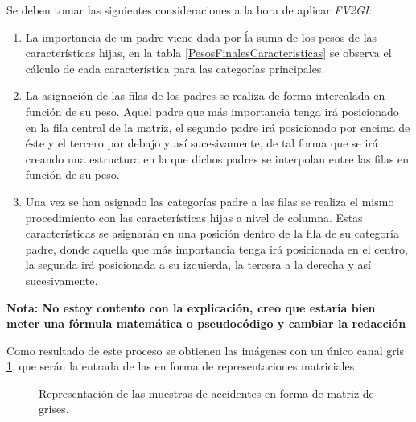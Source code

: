         Se deben tomar las siguientes consideraciones a la hora de aplicar \textit{FV2GI}:

        \begin{enumerate}

            \item La importancia de un padre viene dada por ĺa suma de los pesos de las características hijas, en la tabla \ref{PesosFinalesCaracteristicas} se observa el cálculo de cada característica para las categorías principales.

            \item La asignación de las filas de los padres se realiza de forma intercalada en función de su peso. Aquel padre que más importancia tenga irá posicionado en la fila central de la matriz, el segundo padre irá posicionado por encima de éste y el tercero por debajo y así sucesivamente, de tal forma que se irá creando una estructura en la que dichos padres se interpolan entre las filas en función de su peso.

            \item Una vez se han asignado las categorías padre a las filas se realiza el mismo procedimiento con las características hijas a nivel de columna. Estas características se asignarán en una posición dentro de la fila de su categoría padre, donde aquella que más importancia tenga irá posicionada en el centro, la segunda irá posicionada a su izquierda, la tercera a la derecha y así sucesivamente.
        \end{enumerate}

        \textbf{Nota: No estoy contento con la explicación, creo que estaría bien meter una fórmula matemática o pseudocódigo y cambiar la redacción}

        Como resultado de este proceso se obtienen las imágenes con un único canal gris \ref{SampledImagesExampleImage}, que serán la entrada de las  en forma de representaciones matriciales.

        \begin{figure}[H]
            \centering
            
            
            

            \caption{Representación de las muestras de accidentes en forma de matriz de grises.}
            \label{SampledImagesExampleImage}
        \end{figure}

